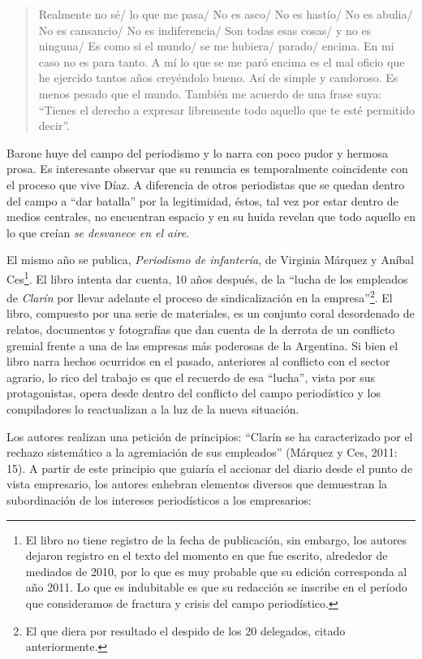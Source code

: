 \begin{quote}
Realmente no sé/ lo que me pasa/ No es asco/ No es hastío/ No es abulia/ No es cansancio/ No es indiferencia/ Son todas esas cosas/ y no es ninguna/ Es como si el mundo/ se me hubiera/ parado/ encima. En mi caso no es para tanto. A mí lo que se me paró encima es el mal oficio que he ejercido tantos años creyéndolo bueno. Así de simple y candoroso. Es menos pesado que el mundo. También me acuerdo de una frase suya: ``Tienes el derecho a expresar libremente todo aquello que te esté permitido decir''.
\end{quote}

Barone huye del campo del periodismo y lo narra con poco pudor y hermosa prosa. Es interesante observar que su renuncia es temporalmente coincidente con el proceso que vive Díaz. A diferencia de otros periodistas que se quedan dentro del campo a ``dar batalla'' por la legitimidad, éstos, tal vez por estar dentro de medios centrales, no encuentran espacio y en su huida revelan que todo aquello en lo que creían \emph{se desvanece en el aire}.

El mismo año se publica, \emph{Periodismo de infantería}, de Virginia Márquez y Aníbal Ces\footnote{El libro no tiene registro de la fecha de publicación, sin embargo, los autores dejaron registro en el texto del momento en que fue escrito, alrededor de mediados de 2010, por lo que es muy probable que su edición corresponda al año 2011. Lo que es indubitable es que su redacción se inscribe en el período que consideramos de fractura y crisis del campo periodístico.}. El libro intenta dar cuenta, 10 años después, de la ``lucha de los empleados de \emph{Clarín} por llevar adelante el proceso de sindicalización en la empresa''\footnote{El que diera por resultado el despido de los 20 delegados, citado anteriormente.}. El libro, compuesto por una serie de materiales, es un conjunto coral desordenado de relatos, documentos y fotografías que dan cuenta de la derrota de un conflicto gremial frente a una de las empresas más poderosas de la Argentina. Si bien el libro narra hechos ocurridos en el pasado, anteriores al conflicto con el sector agrario, lo rico del trabajo es que el recuerdo de esa ``lucha'', vista por sus protagonistas, opera desde dentro del conflicto del campo periodístico y los compiladores lo reactualizan a la luz de la nueva situación.

Los autores realizan una petición de principios: ``Clarín se ha caracterizado por el rechazo sistemático a la agremiación de sus empleados'' (Márquez y Ces, 2011: 15). A partir de este principio que guiaría el accionar del diario desde el punto de vista empresario, los autores enhebran elementos diversos que demuestran la subordinación de los intereses periodísticos a los empresarios:

